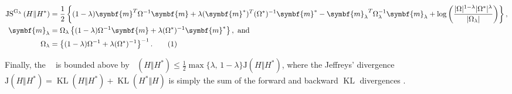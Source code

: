 \documentclass[12pt,compact]{article}
\DeclareMathOperator{\KL}{KL}
\DeclarePairedDelimiter\abs{\lvert}{\rvert}%
\newcommand{\JSGa}{\mathop{\mathrm{JS}^{\mathrm{G}_{\lambda}}}\nolimits}
\newcommand\numberthis{\addtocounter{equation}{1}\tag{\theequation}}
\begin{document}
\begin{align*}
  \JSGa{}(H \Vert H^*) &= \frac{1}{2} \left\{ (1-\lambda) \symbf{m}^T \Omega^{-1} \symbf{m} + \lambda (\symbf{m}^*)^T (\Omega^*)^{-1} \symbf{m}^* - {\symbf{m}_{\lambda}}^T \Omega_{\lambda}^{-1} \symbf{m}_{\lambda} + \log{\left( \frac{\abs{\Omega}^{1-\lambda} \abs{\Omega^*}^{\lambda}}{\abs{\Omega_{\lambda}}} \right)} \right\}, \\
  \symbf{m}_{\lambda} &= \Omega_{\lambda} \left\{(1-\lambda) \Omega^{-1} \symbf{m} + \lambda (\Omega^*)^{-1} \symbf{m}^* \right\}, \text{ and} \\
  \Omega_{\lambda} &= \left\{ (1-\lambda) \Omega^{-1} + \lambda (\Omega^*)^{-1} \right\}^{-1}. \numberthis \label{eq:js_norm_mvn1}
\end{align*} 

Finally, the $\JSGa{}$ is bounded above by $\JSGa{(H \Vert H^*)} \leq \frac{1}{2}\max\{\lambda,\,1-\lambda\}\mathrm{J}(H \Vert H^*)$, 
where the Jeffreys' divergence $\mathrm{J}(H \Vert H^*) = \KL{(H \Vert H^*)} + \KL{(H^* \Vert H)}$ is simply the sum of the forward and backward $\KL{}$ divergences \citep{Nielsen2025}.
\end{document}
